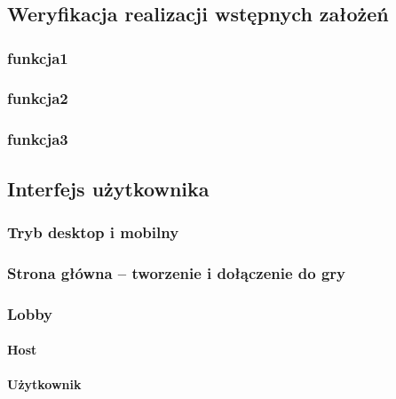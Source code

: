 \chapter{\ChapterTitleResults}
\label{sec:wyniki-projektu}

\section{Weryfikacja realizacji wstępnych założeń}

\subsection{funkcja1}
\subsection{funkcja2}
\subsection{funkcja3}


\section{Interfejs użytkownika}

\subsection{Tryb desktop i mobilny}

\subsection{Strona główna -- tworzenie i dołączenie do gry}

\subsection{Lobby}
\subsubsection{Host}
\subsubsection{Użytkownik}

